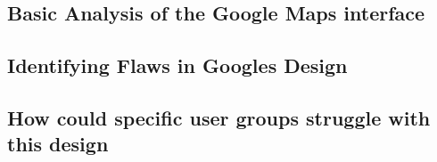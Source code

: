 \subsection{Basic Analysis of the Google Maps interface}

\subsection{Identifying Flaws in Googles Design}

\subsection{How could specific user groups struggle with this design}

\newpage